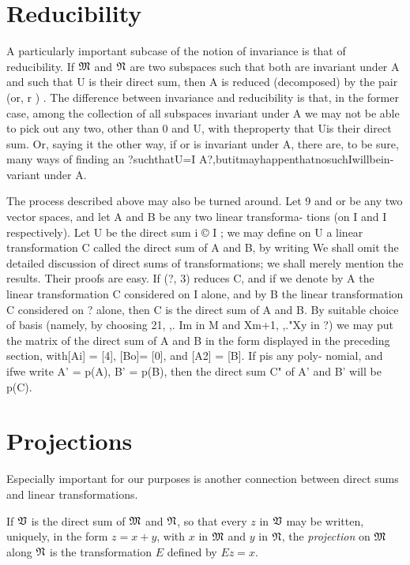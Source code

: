 \section{Reducibility}

A particularly important subcase of the notion of invariance is that of reducibility. If \(\frak{M}\) and \(\frak{N}\) are two subspaces such that both are invariant under A and such that U is their direct sum, then A is reduced (decomposed) by the pair (or, r ) . The difference between invariance and reducibility is that, in the former case, among the collection of all subspaces invariant under A we may not be able to pick out any two, other than 0 and U, with theproperty that Uis their direct sum. Or, saying it the other way, if or is invariant under A, there are, to be sure, many ways of finding an ?suchthatU=I A?,butitmayhappenthatnosuchIwillbein- variant under A.

The process described above may also be turned around. Let 9 and
or be any two vector spaces, and let A and B be any two linear transforma-
tions (on I and I respectively). Let U be the direct sum i © I ; we may define on U a linear transformation C called the direct sum of A and
B, by writing
We shall omit the detailed discussion of direct sums of transformations; we shall merely mention the results. Their proofs are easy. If (?, 3) reduces C, and if we denote by A the linear transformation C considered
on I alone, and by B the linear transformation C considered on ? alone, then C is the direct sum of A and B. By suitable choice of basis (namely, by choosing 21, ,. Im in M and Xm+1, ,."Xy in ?) we may put the matrix of the direct sum of A and B in the form displayed in the preceding
section, with[Ai] = [4], [Bo]= [0], and [A2] = [B]. If pis any poly- nomial, and ifwe write A' = p(A), B' = p(B), then the direct sum C" of A' and B' will be p(C).


\section{Projections}

Especially important for our purposes is another connection between direct sums
and linear transformations.

\begin{definition}
    If \(\frak{V}\) is the direct sum of \(\frak{M}\) and \(\frak{N}\), so that every \(z\) in \(\frak{V}\) may be written, uniquely, in the form \(z = x + y\), with \(x\) in \(\frak{M}\) and \(y\) in \(\frak{N}\), the \emph{projection} on \(\frak{M}\) along \(\frak{N}\) is the transformation \(E\) defined by \(Ez = x\).
\end{definition}

